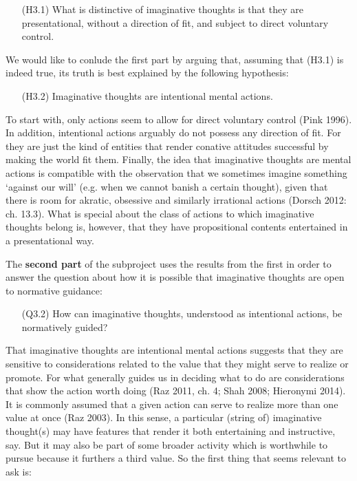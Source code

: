 \vspace{-.1cm}
\begin{itemize}[leftmargin=2cm]
\item[(H3.1)] What is distinctive of imaginative thoughts is that they are presentational, without a direction of fit, and subject to direct
voluntary control.
\end{itemize}
\vspace{-.1cm}

\noindent We would like to conlude the first part by arguing that, assuming that (H3.1) is indeed true, its truth is best explained by the
following hypothesis:

\vspace{-.1cm}
\begin{itemize}[leftmargin=2cm]
\item[(H3.2)] Imaginative thoughts are intentional mental actions.
\end{itemize}
\vspace{-.1cm}

\noindent To start with, only actions seem to allow for direct voluntary control (Pink 1996). In addition, intentional actions arguably do not possess any direction of fit. For they are just the kind of entities that render conative attitudes successful by making the world fit them. Finally, the idea that imaginative thoughts are mental actions is compatible with the observation that we sometimes imagine something `against our will' (e.g. when we cannot banish a certain thought), given that there is room for akratic, obsessive and similarly irrational actions (Dorsch 2012: ch. 13.3). What is special about the class of actions to which imaginative thoughts belong is, however, that they have propositional contents entertained in a presentational way.

The \textbf{second part} of the subproject uses the results from the first in order to answer the question about how it is possible that imaginative thoughts are open to normative guidance:

\vspace{-.1cm}
\begin{itemize}[leftmargin=2cm]
\item[(Q3.2)] How can imaginative thoughts, understood as intentional actions, be normatively guided?
\end{itemize}
\vspace{-.1cm}

\noindent That imaginative thoughts are intentional mental actions suggests that they are sensitive to considerations related to the value that they might serve to realize or promote. For what generally guides us in deciding what to do are considerations that show the action worth doing (Raz 2011, ch. 4; Shah 2008; Hieronymi 2014). It is commonly assumed that a given action can serve to realize more than one value at once (Raz 2003). In this sense, a particular (string of) imaginative thought(s) may have features that render it both entertaining and instructive, say. But it may also be part of some broader activity which is worthwhile to pursue because it furthers a third value. So the first thing that seems relevant to ask is:

